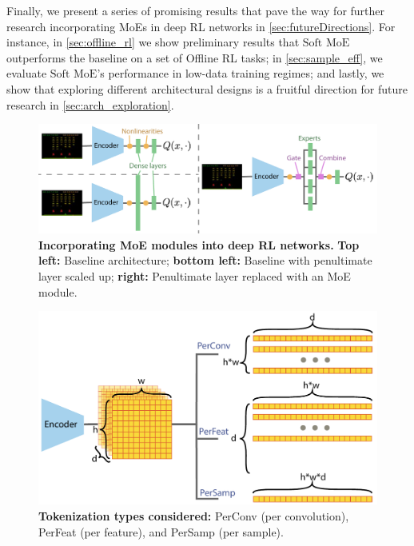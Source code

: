 \documentclass{article}
\theoremstyle{plain}
\theoremstyle{definition}
\theoremstyle{remark}
\newcommand{\softmoe}{$\textrm{Soft MoE}$}
\begin{document}
Finally, we present a series of promising results that pave the way for further research incorporating MoEs in deep RL networks in \cref{sec:futureDirections}. For instance, in \cref{sec:offline_rl} we show preliminary results that \softmoe{} outperforms the baseline on a set of Offline RL tasks; in \cref{sec:sample_eff}, we evaluate \softmoe{}'s performance in low-data training regimes; and lastly, we show that exploring different architectural designs is a fruitful direction for future research in \cref{sec:arch_exploration}.


\ifarxiv
    \begin{figure}[!h]
        \centering
        \includegraphics[width=\linewidth]{figures/moeArchitecture.pdf}
        \caption{{\bf Incorporating MoE modules into deep RL networks.} {\bf Top left:} Baseline architecture; {\bf bottom left:} Baseline with penultimate layer scaled up; {\bf right:} Penultimate layer replaced with an MoE module.}
        \label{fig:moeArchitecture}%
    \end{figure}
\fi

\begin{figure}[!t]
    \centering
    \includegraphics[width=\linewidth]{figures/tokenization.pdf}
    \caption{{\bf Tokenization types considered:} PerConv (per convolution), PerFeat (per feature), and PerSamp (per sample).}
    \label{fig:tokenization}%
    \vspace{-0.1cm}
\end{figure}
\end{document}
